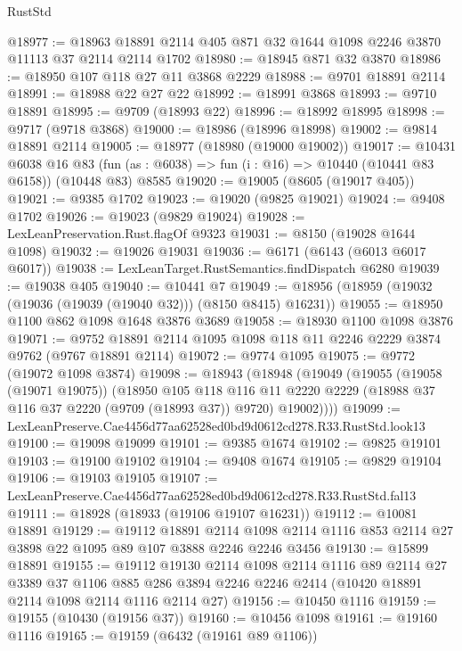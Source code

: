 \begin{lexlean}{RustStd}
\begin{coremodule}
@18977 := @18963 @18891 @2114 @405 @871 @32 @1644 @1098 @2246 @3870 @11113 @37 @2114 @2114 @1702
@18980 := @18945 @871 @32 @3870
@18986 := @18950 @107 @118 @27 @11 @3868 @2229
@18988 := @9701 @18891 @2114
@18991 := @18988 @22 @27 @22
@18992 := @18991 @3868
@18993 := @9710 @18891
@18995 := @9709 (@18993 @22)
@18996 := @18992 @18995
@18998 := @9717 (@9718 @3868)
@19000 := @18986 (@18996 @18998)
@19002 := @9814 @18891 @2114
@19005 := @18977 (@18980 (@19000 @19002))
@19017 := @10431
    @6038
    @16
    @83
    (fun (as : @6038) => fun (i : @16) => @10440 (@10441 @83 @6158))
    (@10448 @83)
    @8585
@19020 := @19005 (@8605 (@19017 @405))
@19021 := @9385 @1702
@19023 := @19020 (@9825 @19021)
@19024 := @9408 @1702
@19026 := @19023 (@9829 @19024)
@19028 := LexLeanPreservation.Rust.flagOf @9323
@19031 := @8150 (@19028 @1644 @1098)
@19032 := @19026 @19031
@19036 := @6171 (@6143 (@6013 @6017 @6017))
@19038 := LexLeanTarget.RustSemantics.findDispatch @6280
@19039 := @19038 @405
@19040 := @10441 @7
@19049 := @18956 (@18959 (@19032 (@19036 (@19039 (@19040 @32))) (@8150 @8415) @16231))
@19055 := @18950 @1100 @862 @1098 @1648 @3876 @3689
@19058 := @18930 @1100 @1098 @3876
@19071 := @9752 @18891 @2114 @1095 @1098 @118 @11 @2246 @2229 @3874 @9762 (@9767 @18891 @2114)
@19072 := @9774 @1095
@19075 := @9772 (@19072 @1098 @3874)
@19098 := @18943
    (@18948
      (@19049
        (@19055
          (@19058 (@19071 @19075))
          (@18950
            @105
            @118
            @116
            @11
            @2220
            @2229
            (@18988 @37 @116 @37 @2220 (@9709 (@18993 @37)) @9720)
            @19002))))
@19099 := LexLeanPreserve.Cae4456d77aa62528ed0bd9d0612cd278.R33.RustStd.look13
@19100 := @19098 @19099
@19101 := @9385 @1674
@19102 := @9825 @19101
@19103 := @19100 @19102
@19104 := @9408 @1674
@19105 := @9829 @19104
@19106 := @19103 @19105
@19107 := LexLeanPreserve.Cae4456d77aa62528ed0bd9d0612cd278.R33.RustStd.fal13
@19111 := @18928 (@18933 (@19106 @19107 @16231))
@19112 := @10081 @18891
@19129 := @19112
    @18891
    @2114
    @1098
    @2114
    @1116
    @853
    @2114
    @27
    @3898
    @22
    @1095
    @89
    @107
    @3888
    @2246
    @2246
    @3456
@19130 := @15899 @18891
@19155 := @19112
    @19130
    @2114
    @1098
    @2114
    @1116
    @89
    @2114
    @27
    @3389
    @37
    @1106
    @885
    @286
    @3894
    @2246
    @2246
    @2414
    (@10420 @18891 @2114 @1098 @2114 @1116 @2114 @27)
@19156 := @10450 @1116
@19159 := @19155 (@10430 (@19156 @37))
@19160 := @10456 @1098
@19161 := @19160 @1116
@19165 := @19159 (@6432 (@19161 @89 @1106))

\end{coremodule}
\end{lexlean}
